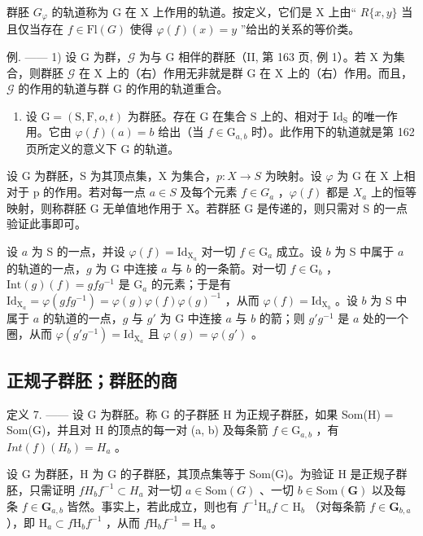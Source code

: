 群胚 \(G_{\varphi}\) 的轨道称为 G 在 X 上作用的轨道。按定义，它们是 X 上由“ \(R\{x,y\}\) 当且仅当存在 \(f \in \mathrm{Fl}(G)\) 使得 \(\varphi(f)(x) = y\) ”给出的关系的等价类。

例. —— 1) 设 G 为群，\(\mathcal{G}\) 为与 G 相伴的群胚（II, 第 163 页, 例 1）。若 X 为集合，则群胚 \(\mathcal{G}\) 在 X 上的（右）作用无非就是群 G 在 X 上的（右）作用。而且，\(\mathcal{G}\) 的作用的轨道与群 G 的作用的轨道重合。

\begin{enumerate}
\def\labelenumi{\arabic{enumi})}
\setcounter{enumi}{1}
\tightlist
\item
  设 \(\mathrm{G} = (\mathrm{S},\mathrm{F},o,t)\) 为群胚。存在 \(\mathrm{G}\) 在集合 \(\mathrm{S}\) 上的、相对于 \(\mathrm{Id}_{\mathrm{S}}\) 的唯一作用。它由 \(\varphi(f)(a) = b\) 给出（当 \(f \in \mathrm{G}_{a,b}\) 时）。此作用下的轨道就是第 162 页所定义的意义下 \(\mathrm{G}\) 的轨道。
\end{enumerate}

设 G 为群胚，S 为其顶点集，X 为集合，\(p: X \to S\) 为映射。设 \(\varphi\) 为 G 在 X 上相对于 p 的作用。若对每一点 \(a \in S\) 及每个元素 \(f \in G_{a}\) ，\(\varphi(f)\) 都是 \(X_{a}\) 上的恒等映射，则称群胚 G 无单值地作用于 X。若群胚 G 是传递的，则只需对 S 的一点验证此事即可。

设 \(a\) 为 S 的一点，并设 \(\varphi(f) = \mathrm{Id}_{\mathrm{X}_a}\) 对一切 \(f \in \mathrm{G}_a\) 成立。设 \(b\) 为 S 中属于 \(a\) 的轨道的一点，\(g\) 为 G 中连接 \(a\) 与 \(b\) 的一条箭。对一切 \(f \in \mathrm{G}_b\) ，\(\mathrm{Int}(g)(f) = gfg^{-1}\) 是 \(\mathrm{G}_a\) 的元素；于是有 \(\mathrm{Id}_{\mathrm{X}_a} = \varphi(gfg^{-1}) = \varphi(g)\varphi(f)\varphi(g)^{-1}\) ，从而 \(\varphi(f) = \mathrm{Id}_{\mathrm{X}_b}\) 。设 \(b\) 为 S 中属于 \(a\) 的轨道的一点，\(g\) 与 \(g'\) 为 G 中连接 \(a\) 与 \(b\) 的箭；则 \(g'g^{-1}\) 是 \(a\) 处的一个圈，从而 \(\varphi(g'g^{-1}) = \mathrm{Id}_{\mathrm{X}_a}\) 且 \(\varphi(g) = \varphi(g')\) 。

\subsection{正规子群胚；群胚的商}

定义 7. —— 设 G 为群胚。称 G 的子群胚 H 为正规子群胚，如果 Som(H) = Som(G)，并且对 H 的顶点的每一对 (a, b) 及每条箭 \(f \in \mathrm{G}_{a,b}\) ，有 \(Int(f)(H_b) = H_a\) 。

设 G 为群胚，H 为 G 的子群胚，其顶点集等于 Som(G)。为验证 H 是正规子群胚，只需证明 \(fH_{b}f^{-1} \subset H_{a}\) 对一切 \(a \in \text{Som}(G)\) 、一切 \(b \in \text{Som}(\mathbf{G})\) 以及每条 \(f \in \mathbf{G}_{a,b}\) 皆然。事实上，若此成立，则也有 \(f^{-1}\mathrm{H}_a f \subset \mathrm{H}_b\) （对每条箭 \(f \in \mathbf{G}_{b,a}\) ），即 \(\mathrm{H}_a \subset f\mathrm{H}_b f^{-1}\) ，从而 \(f\mathrm{H}_b f^{-1} = \mathrm{H}_a\) 。

